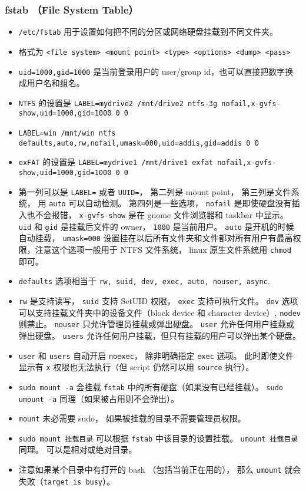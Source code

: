 \subsubsection{fstab （File System Table）}
\begin{itemize}
\item \verb`/etc/fstab` 用于设置如何把不同的分区或网络硬盘挂载到不同文件夹。
\item 格式为 \verb`<file system> <mount point> <type> <options> <dump> <pass>`
\item \verb`uid=1000,gid=1000` 是当前登录用户的 user/group id，也可以直接把数字换成用户名和组名。
\item \verb`NTFS` 的设置是 \verb`LABEL=mydrive2 /mnt/drive2 ntfs-3g nofail,x-gvfs-show,uid=1000,gid=1000 0 0`
\item \verb`LABEL=win /mnt/win ntfs defaults,auto,rw,nofail,umask=000,uid=addis,gid=addis 0 0`
\item \verb`exFAT` 的设置是 \verb`LABEL=mydrive1 /mnt/drive1 exfat nofail,x-gvfs-show,uid=1000,gid=1000 0 0`
\item 第一列可以是 \verb`LABEL=` 或者 \verb`UUID=`， 第二列是 mount point， 第三列是文件系统， 用 \verb`auto` 可以自动检测。 第四列是一些选项， \verb`nofail` 是即使硬盘没有插入也不会报错， \verb`x-gvfs-show` 是在 gnome 文件浏览器和 taskbar 中显示。 \verb`uid` 和 \verb`gid` 是挂载后文件的 owner， \verb`1000` 是当前用户。 \verb`auto` 是开机的时候自动挂载， \verb`umask=000` 设置挂在以后所有文件夹和文件都对所有用户有最高权限，注意这个选项一般用于 NTFS 文件系统， linux 原生文件系统用 \verb`chmod` 即可。
\item \verb`defaults` 选项相当于 \verb`rw, suid, dev, exec, auto, nouser, async`.
\item \verb`rw` 是支持读写， \verb`suid` 支持 SetUID 权限， \verb`exec` 支持可执行文件。 \verb`dev` 选项可以支持挂载文件夹中的设备文件（block device 和 character device）, \verb`nodev` 则禁止。 \verb`nouser` 只允许管理员挂载或弹出硬盘。 \verb`user` 允许任何用户挂载或弹出硬盘。 \verb`users` 允许任何用户挂载，但只有挂载的用户可以弹出某个硬盘。
\item \verb`user` 和 \verb`users` 自动开启 \verb`noexec`， 除非明确指定 \verb`exec` 选项。 此时即使文件显示有 \verb`x` 权限也无法执行（但 script 仍然可以用 \verb`source` 执行）。
\item \verb`sudo mount -a` 会挂载 \verb`fstab` 中的所有硬盘（如果没有已经挂载）。 \verb`sudo umount -a` 同理（如果被占用则不会弹出）。
\item \verb`mount` 未必需要 sudo， 如果被挂载的目录不需要管理员权限。
\item \verb`sudo mount 挂载目录` 可以根据 \verb`fstab` 中该目录的设置挂载。 \verb`umount 挂载目录` 同理。 可以是相对或绝对目录。
\item 注意如果某个目录中有打开的 bash （包括当前正在用的）， 那么 \verb`umount` 就会失败（\verb`target is busy`）。
\end{itemize}

